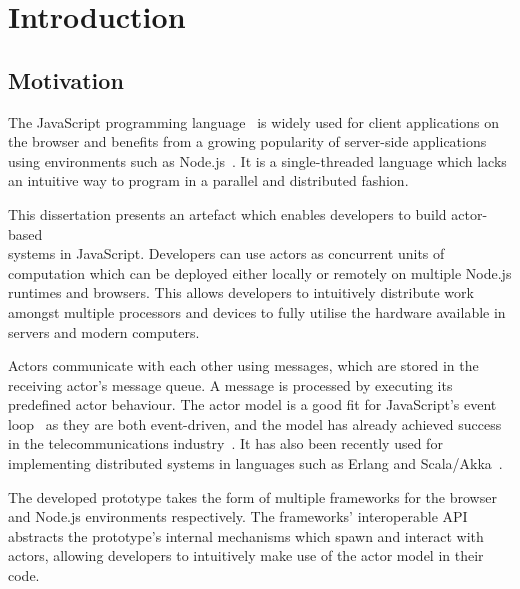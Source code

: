\documentclass[oneside]{um-fict}
\begin{document}
\tableofcontents*\if@openright\cleardoublepage\else\clearpage\fi
\listoffigures*\if@openright\cleardoublepage\else\clearpage
\listoftables*\if@openright\cleardoublepage\else\clearpage

\mainmatter
\chapter{Introduction}\label{chap:intro}
\section{Motivation}
The JavaScript programming language~\cite{ecmascript} is widely used for client applications on the browser and benefits from a growing popularity of server-side applications using environments such as Node.js~\cite{nodejs}. It is a single-threaded language which lacks an intuitive way to program in a parallel and distributed fashion. 

This dissertation presents an artefact which enables developers to build actor-based\\\cite{hewitt1973session, 43years} systems in JavaScript. Developers can use actors as concurrent units of computation which can be deployed either locally or remotely on multiple Node.js runtimes and browsers. This allows developers to intuitively distribute work amongst multiple processors and devices to fully utilise the hardware available in servers and modern computers.

Actors communicate with each other using messages, which are stored in the receiving actor's message queue. A message is processed by executing its predefined actor behaviour. The actor model is a good fit for JavaScript's event loop~\cite{eventloopbrowser, eventloopnode} as they are both event-driven, and the model has already achieved success in the telecommunications industry~\cite{erlang}. It has also been recently used for implementing distributed systems in languages such as Erlang and Scala/Akka~\cite{haller2012integration}.

The developed prototype takes the form of multiple frameworks for the browser and Node.js environments respectively. The frameworks' interoperable API abstracts the prototype's internal mechanisms which spawn and interact with actors, allowing developers to intuitively make use of the actor model in their code.
\end{document}
